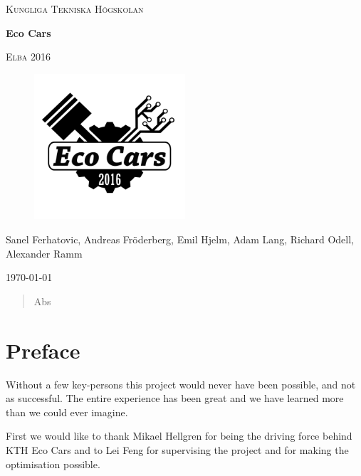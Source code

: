 \documentclass[a4paper, 12pt]{report}
\begin{document}

\begin{titlepage}
	\centering
	{\scshape Kungliga Tekniska Högskolan \par}
	\vspace{2cm}
    {\huge\bfseries Eco Cars\par}
	\vspace{0.5cm}
	{\scshape\Large Elba 2016\par}
	\vspace{1.5cm}
	\begin{figure}[H]
    \centering
    \label{fig:ECO}
    \includegraphics[width=0.5\textwidth]{./img/ECOCARS}
\end{figure}

    {\Large\itshape{Sanel Ferhatovic, Andreas Fröderberg, Emil Hjelm, Adam Lang, Richard Odell, Alexander Ramm \par}}
	\vfill
	\vfill

	{\large \today\par}
\end{titlepage}


\begin{abstract}
Abs
\end{abstract}
\clearpage
\setcounter{page}{3}
\chapter*{Preface}
Without a few key-persons this project would never have been possible, and not as successful. The entire experience has been great and we have learned more than we could ever imagine.

First we would like to thank Mikael Hellgren for being the driving force behind KTH Eco Cars and to Lei Feng for supervising the project and for making the optimisation possible.
\end{document}
